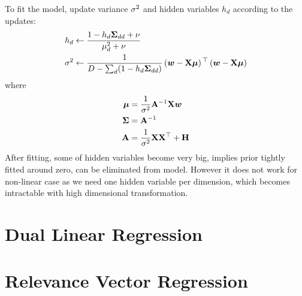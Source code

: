 To fit the model, update variance $\sigma^2$ and hidden variables $h_d$ according to the updates:
\begin{align*}
	h_d&\gets\frac{1-h_d\mathbf{\Sigma}_{dd}+\nu}{\mu_d^2+\nu} \\
	\sigma^2&\gets\frac{1}{D-\sum_d(1-h_d\mathbf{\Sigma}_{dd})}\left(\boldsymbol{w}-\mathbf{X}\boldsymbol{\mu}\right){}^\top\left(\boldsymbol{w}-\mathbf{X}\boldsymbol{\mu}\right)
\end{align*}
where
\begin{align*}
	\boldsymbol{\mu}&=\frac{1}{\sigma^2}\mathbf{A}^{-1}\mathbf{X}\boldsymbol{w} \\
	\mathbf{\Sigma}&=\mathbf{A}^{-1} \\
	\mathbf{A}&=\frac{1}{\sigma^2}\mathbf{X}\mathbf{X}^\top+\mathbf{H}
\end{align*}
After fitting, some of hidden variables become very big, implies prior tightly fitted around zero, can be eliminated from model. However it does not work for non-linear case as we need one hidden variable per dimension, which becomes intractable with high dimensional transformation.

\section{Dual Linear Regression}

\section{Relevance Vector Regression}
